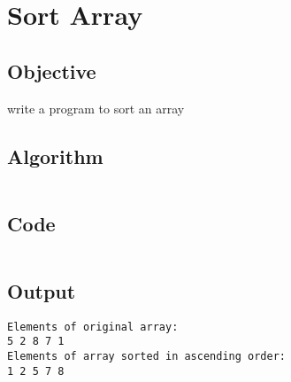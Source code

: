 \section{Sort Array}
\label{sec:Sort Array}

\subsection{Objective}
write a program to sort an array

\subsection{Algorithm}
\begin{lstlisting}[style=mystyle]
\end{lstlisting}

\subsection{Code}
\inputminted[]{c}{../../Code/csort.c}

\subsection{Output}
\begin{lstlisting}[style=output]
Elements of original array: 
5 2 8 7 1 
Elements of array sorted in ascending order: 
1 2 5 7 8  
\end{lstlisting}

\pagebreak
